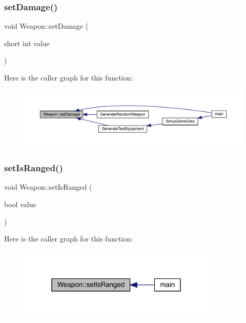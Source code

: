 \mbox{\label{class_weapon_a0c582ba1c1413a4ecda931bb8acff458}} 
\subsubsection{\texorpdfstring{set\+Damage()}{setDamage()}}
{\footnotesize\ttfamily void Weapon\+::set\+Damage (\begin{DoxyParamCaption}\item[{short int}]{value }\end{DoxyParamCaption})}

Here is the caller graph for this function\+:
\nopagebreak
\begin{figure}[H]
\begin{center}
\leavevmode
\includegraphics[width=350pt]{db/de5/class_weapon_a0c582ba1c1413a4ecda931bb8acff458_icgraph}
\end{center}
\end{figure}
\mbox{\label{class_weapon_a73bb6176d7e535811f30a3ee9df53b8d}} 
\subsubsection{\texorpdfstring{set\+Is\+Ranged()}{setIsRanged()}}
{\footnotesize\ttfamily void Weapon\+::set\+Is\+Ranged (\begin{DoxyParamCaption}\item[{bool}]{value }\end{DoxyParamCaption})}

Here is the caller graph for this function\+:
\nopagebreak
\begin{figure}[H]
\begin{center}
\leavevmode
\includegraphics[width=268pt]{db/de5/class_weapon_a73bb6176d7e535811f30a3ee9df53b8d_icgraph}
\end{center}
\end{figure}
\mbox{\label{class_weapon_a2861d732a0cccff20a9ea29548d05702}} 
